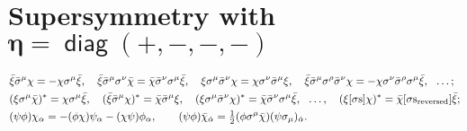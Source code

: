 \documentclass[CheatSheet]{subfiles}
\begin{document}
\section[Supersymmetry with $\eta=\diag(+,-,-,-)$]{Supersymmetry with $\bm{\eta=\mathop{\mathsf{diag}}(+,-,-,-)}$}




\begin{align*}
& \bar\xi\bar\sigma^\mu\chi = -\chi\sigma^\mu\bar\xi,\quad
  \bar\xi\bar\sigma^\mu\sigma^\nu\bar\chi = \bar\chi\bar\sigma^\nu\sigma^\mu\bar\xi,\quad
  \xi\sigma^\mu\bar\sigma^\nu\chi = \chi\sigma^\nu\bar\sigma^\mu\xi,\quad
  \bar\xi\bar\sigma^\mu\sigma^\rho\bar\sigma^\nu\chi = -\chi\sigma^\nu\bar\sigma^\rho\sigma^\mu\bar\xi,~~\dots;
\\&
  (\xi\sigma^\mu\bar\chi)^* = \chi\sigma^\mu\bar\xi,\quad
  (\bar\xi\bar\sigma^\mu\chi)^* = \bar\chi\bar\sigma^\mu\xi,\quad
  (\xi\sigma^\mu\bar\sigma^\nu\chi)^* = \bar\chi\bar\sigma^\nu\sigma^\mu\bar\xi,~~\dots,\quad
  (\xi[\text{$\sigma$s}]\chi)^* = \bar\chi[\text{$\sigma$s$_\text{reversed}$}]\bar\xi;
\\&
 (\psi\phi)\chi_\alpha=-(\phi\chi)\psi_\alpha-(\chi\psi)\phi_\alpha,\qquad
 (\psi\phi)\bar\chi_{\dot\alpha}=\tfrac12(\phi\sigma^\mu\bar\chi)(\psi\sigma_\mu)_{\dot\alpha}.
\end{align*}
\end{document}
